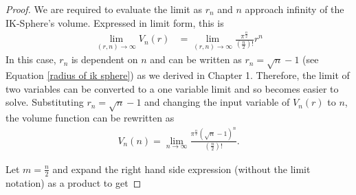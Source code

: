 \begin{proof}
    We are required to evaluate the limit as $r_n$ and $n$ approach infinity of the IK-Sphere's volume. Expressed in limit form, this is
    \begin{align*}
        \lim_{(r,n)\to\infty}V_n(r)&=\lim_{(r,n)\to\infty}\frac{\pi^{\frac{n}{2}}}{\left(\frac{n}{2}\right)!}r^n
    \end{align*}
    In this case, $r_n$ is dependent on $n$ and can be written as $r_n=\sqrt{n}-1$ (see Equation \ref{radius of ik sphere}) as we derived in Chapter 1. Therefore, the limit of two variables can be converted to a one variable limit and so becomes easier to solve. Substituting $r_n=\sqrt{n}-1$ and changing the input variable of $V_n(r)$ to $n$, the volume function can be rewritten as
    \begin{align*}
        V_n(n) = \lim_{n\to\infty}\frac{\pi^{\frac{n}{2}}{\left(\sqrt{n}-1\right)}^n}{\left(\frac{n}{2}\right)!}.
    \end{align*}
    
    \noindent
    Let $m=\frac{n}{2}$ and expand the right hand side expression (without the limit notation) as a product to get
    

\end{proof}

